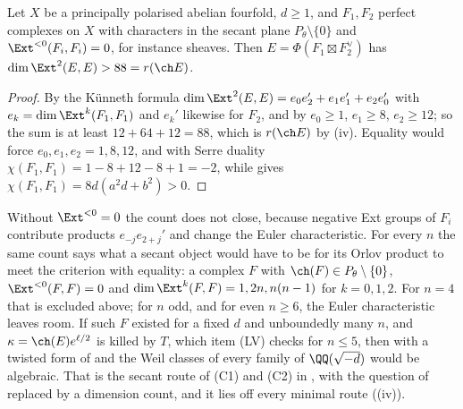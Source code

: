 \begin{proposition}[No Orlov product at $n=4$]\label{prop:orlovfour}
Let $X$ be a principally polarised abelian fourfold, $d\ge1$, and
$F_{1},F_{2}$ perfect complexes on $X$ with characters in the secant plane
$P_{\theta}\setminus\{0\}$ and $\Ext^{<0}(F_{i},F_{i})=0$, for instance
sheaves. Then $E=\Phi(F_{1}\boxtimes F_{2}^{\vee})$ has
$\dim\Ext^{2}(E,E)>88=r(\ch E)$.
\end{proposition}

\begin{proof}
By the K\"unneth formula $\dim\Ext^{2}(E,E)=e_{0}e_{2}'+e_{1}e_{1}'+e_{2}e_{0}'$
with $e_{k}=\dim\Ext^{k}(F_{1},F_{1})$ and $e_{k}'$ likewise for $F_{2}$, and by
 $e_{0}\ge1$, $e_{1}\ge8$, $e_{2}\ge12$; so the sum is
at least $12+64+12=88$, which is $r(\ch E)$ by (iv). Equality
would force $e_{0},e_{1},e_{2}=1,8,12$, and with Serre duality
$\chi(F_{1},F_{1})=1-8+12-8+1=-2$, while  gives
$\chi(F_{1},F_{1})=8d(a^{2}d+b^{2})>0$.
\end{proof}

Without $\Ext^{<0}=0$ the count does not close, because negative Ext groups
of $F_{i}$ contribute products $e_{-j}e_{2+j}'$ and change the Euler
characteristic. For every $n$ the same count says what a secant object would
have to be for its Orlov product to meet the criterion with equality: a
complex $F$ with $\ch(F)\in P_{\theta}\setminus\{0\}$,
$\Ext^{<0}(F,F)=0$ and $\dim\Ext^{k}(F,F)=1,2n,n(n-1)$ for $k=0,1,2$. For
$n=4$ that is excluded above; for $n$ odd, and for even $n\ge6$, the Euler
characteristic leaves room. If such $F$ existed for a fixed $d$ and unboundedly
many $n$, and $\kappa=\ch(E)e^{\ell/2}$ is killed by $T$, which item (LV)
checks for $n\le5$, then with a twisted form of  and
 the Weil classes of every family of $\QQ(\sqrt{-d})$ would
be algebraic. That is the secant route of (C1) and (C2) in
, with the question of \cite{Mar25b} replaced by a
dimension count, and it lies off every minimal route ((iv)).

